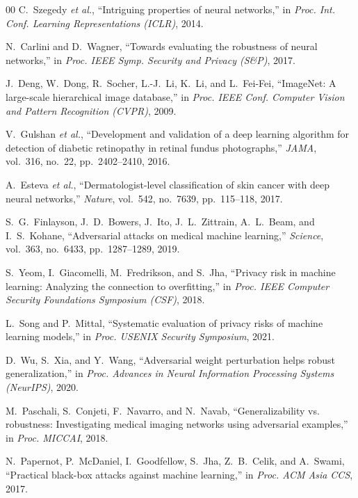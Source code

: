 \documentclass[conference]{IEEEtran}
\begin{document}
\begin{thebibliography}{00}
C.~Szegedy \textit{et al.}, ``Intriguing properties of neural networks,'' in \textit{Proc. Int. Conf. Learning Representations (ICLR)}, 2014.

N.~Carlini and D.~Wagner, ``Towards evaluating the robustness of neural networks,'' in \textit{Proc. IEEE Symp. Security and Privacy (S\&P)}, 2017.

J.~Deng, W.~Dong, R.~Socher, L.-J.~Li, K.~Li, and L.~Fei-Fei, ``ImageNet: A large-scale hierarchical image database,'' in \textit{Proc. IEEE Conf. Computer Vision and Pattern Recognition (CVPR)}, 2009.

V.~Gulshan \textit{et al.}, ``Development and validation of a deep learning algorithm for detection of diabetic retinopathy in retinal fundus photographs,'' \textit{JAMA}, vol.~316, no.~22, pp.~2402--2410, 2016.

A.~Esteva \textit{et al.}, ``Dermatologist-level classification of skin cancer with deep neural networks,'' \textit{Nature}, vol.~542, no.~7639, pp.~115--118, 2017.

S.~G.~Finlayson, J.~D.~Bowers, J.~Ito, J.~L.~Zittrain, A.~L.~Beam, and I.~S.~Kohane, ``Adversarial attacks on medical machine learning,'' \textit{Science}, vol.~363, no.~6433, pp.~1287--1289, 2019.

S.~Yeom, I.~Giacomelli, M.~Fredrikson, and S.~Jha, ``Privacy risk in machine learning: Analyzing the connection to overfitting,'' in \textit{Proc. IEEE Computer Security Foundations Symposium (CSF)}, 2018.

L.~Song and P.~Mittal, ``Systematic evaluation of privacy risks of machine learning models,'' in \textit{Proc. USENIX Security Symposium}, 2021.

D.~Wu, S.~Xia, and Y.~Wang, ``Adversarial weight perturbation helps robust generalization,'' in \textit{Proc. Advances in Neural Information Processing Systems (NeurIPS)}, 2020.

M.~Paschali, S.~Conjeti, F.~Navarro, and N.~Navab, ``Generalizability vs. robustness: Investigating medical imaging networks using adversarial examples,'' in \textit{Proc. MICCAI}, 2018.

N.~Papernot, P.~McDaniel, I.~Goodfellow, S.~Jha, Z.~B.~Celik, and A.~Swami, ``Practical black-box attacks against machine learning,'' in \textit{Proc. ACM Asia CCS}, 2017.


\end{thebibliography}
\end{document}

